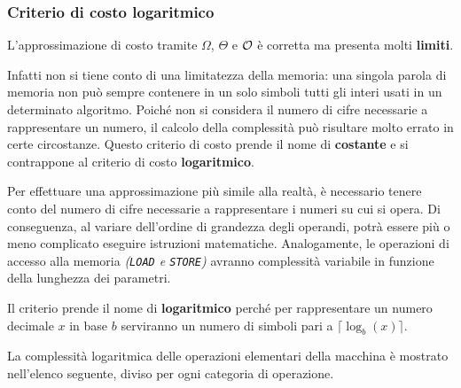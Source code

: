 \documentclass[italian, 10pt]{article}
\begin{document}
\subsubsection{Criterio di costo logaritmico}
\label{sec:criterio-costo-logaritmico}

L'approssimazione di costo tramite \(\Omega\), \(\Theta\) e \(\mathcal{O}\) è corretta ma presenta molti \textbf{limiti}.

Infatti non si tiene conto di una limitatezza della memoria: una singola parola di memoria non può sempre contenere in un solo simboli tutti gli interi usati in un determinato algoritmo.
Poiché non si considera il numero di cifre necessarie a rappresentare un numero, il calcolo della complessità può risultare molto errato in certe circostanze.
Questo criterio di costo prende il nome di \textbf{costante} e si contrappone al criterio di costo \textbf{logaritmico}.

\bigskip
Per effettuare una approssimazione più simile alla realtà, è necessario tenere conto del numero di cifre necessarie a rappresentare i numeri su cui si opera.
Di conseguenza, al variare dell'ordine di grandezza degli operandi, potrà essere più o meno complicato eseguire istruzioni matematiche.
Analogamente, le operazioni di accesso alla memoria \textit{(\texttt{LOAD} e \texttt{STORE})} avranno complessità variabile in funzione della lunghezza dei parametri.

Il criterio prende il nome di \textbf{logaritmico} perché per rappresentare un numero decimale \(x\) in base \(b\) serviranno un numero di simboli pari a \(\lceil \log_b(x) \rceil\).

La complessità logaritmica delle operazioni elementari della macchina \RAM è mostrato nell'elenco seguente, diviso per ogni categoria di operazione.
\end{document}

